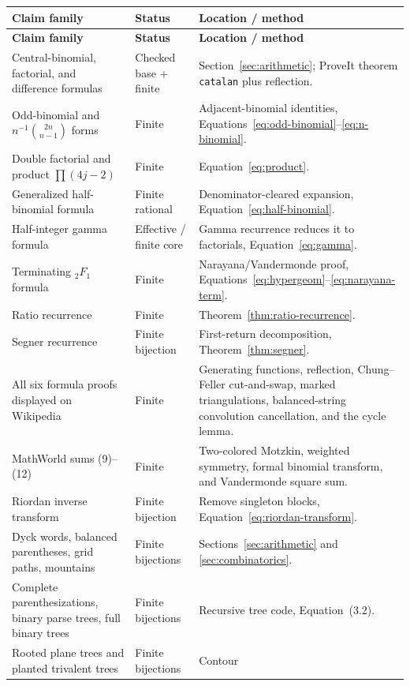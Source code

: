 \small
\begin{longtable}{@{}p{}p{}p{}@{}}
\toprule
\textbf{Claim family} & \textbf{Status} & \textbf{Location / method}\\
\midrule
\endfirsthead
\toprule
\textbf{Claim family} & \textbf{Status} & \textbf{Location / method}\\
\midrule
\endhead
Central-binomial, factorial, and difference formulas &
Checked base + finite & Section~\ref{sec:arithmetic}; ProveIt theorem
\texttt{catalan} plus reflection.\\
Odd-binomial and $n^{-1}\binom{2n}{n-1}$ forms & Finite &
Adjacent-binomial identities, Equations~\eqref{eq:odd-binomial}--\eqref{eq:n-binomial}.\\
Double factorial and product $\prod(4j-2)$ & Finite &
Equation~\eqref{eq:product}.\\
Generalized half-binomial formula & Finite rational &
Denominator-cleared expansion, Equation~\eqref{eq:half-binomial}.\\
Half-integer gamma formula & Effective / finite core &
Gamma recurrence reduces it to factorials, Equation~\eqref{eq:gamma}.\\
Terminating ${}_2F_1$ formula & Finite & Narayana/Vandermonde proof,
Equations~\eqref{eq:hypergeom}--\eqref{eq:narayana-term}.\\
Ratio recurrence & Finite & Theorem~\ref{thm:ratio-recurrence}.\\
Segner recurrence & Finite bijection & First-return decomposition,
Theorem~\ref{thm:segner}.\\
All six formula proofs displayed on Wikipedia & Finite & Generating functions,
reflection, Chung--Feller cut-and-swap, marked triangulations, balanced-string
convolution cancellation, and the cycle lemma.\\
MathWorld sums (9)--(12) & Finite & Two-colored Motzkin, weighted symmetry,
formal binomial transform, and Vandermonde square sum.\\
Riordan inverse transform & Finite bijection & Remove singleton blocks,
Equation~\eqref{eq:riordan-transform}.\\
Dyck words, balanced parentheses, grid paths, mountains & Finite bijections &
Sections~\ref{sec:arithmetic} and \ref{sec:combinatorics}.\\
Complete parenthesizations, binary parse trees, full binary trees & Finite
bijections & Recursive tree code, Equation~(3.2).\\
Rooted plane trees and planted trivalent trees & Finite bijections & Contour

\end{longtable}
